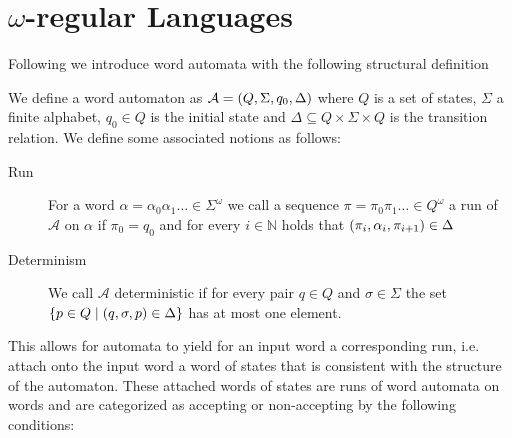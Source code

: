 \section{$\omega$-regular Languages}
Following \cite{LangAutoLog} we introduce word automata with the following
structural definition
\begin{definition}
  We define a word automaton as
  $\mathcal{A} = \left(Q, \Sigma, q_{0}, \Delta\right)$ where
  $Q$ is a set of states, $\Sigma$ a finite alphabet, $q_{0}\in Q$ is the
  initial state and $\Delta\subseteq Q\times\Sigma\times Q$ is the transition
  relation. We define some associated notions as follows:
  \begin{description}
    \item [Run]
      For a word $\alpha = \alpha_{0}\alpha_{1}\dots\in\Sigma^{\omega}$ we call
      a sequence $\pi = \pi_{0}\pi_{1}\dots \in Q^{\omega}$ a run of
      $\mathcal{A}$ on $\alpha$ if $\pi_{0} = q_{0}$ and for every
      $i\in\mathbb{N}$ holds that
      $\left(\pi_{i}, \alpha_{i}, \pi_{i+1}\right)\in\Delta$
    \item [Determinism]
      We call $\mathcal{A}$ deterministic if for every pair $q\in Q$ and
      $\sigma\in\Sigma$ the set
      $\left\{p\in Q\mid\left(q,\sigma,p\right)\in\Delta\right\}$ has at most one
      element.
  \end{description}
\end{definition}
This allows for automata to yield for an input word a corresponding run, i.e.
attach onto the input word a word of states that is consistent with the
structure of the automaton. These attached words of states are runs of word
automata on words and are categorized as accepting or non-accepting by the
following conditions:
